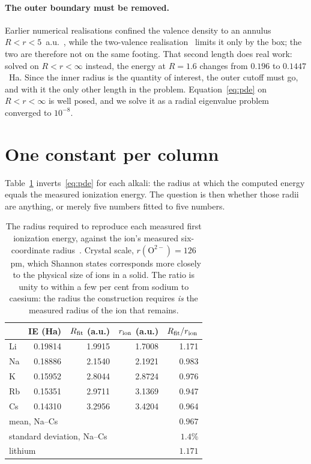 \documentclass[11pt]{article}
\begin{document}
\paragraph{The outer boundary must be removed.} Earlier numerical realisations confined the
valence density to an annulus $R<r<5$~a.u.~\cite{Johnson-code1}, while the two-valence
realisation~\cite{Johnson-code2} limits it only by the box; the two are therefore not on the same
footing. That second length does real work: solved on
$R<r<\infty$ instead, the energy at $R=1.6$ changes from $0.196$ to $0.1447$~Ha. Since the
inner radius is the quantity of interest, the outer cutoff must go, and
with it the only other length in the problem. Equation~\eqref{eq:pde} on $R<r<\infty$ is
well posed, and we solve it as a radial eigenvalue problem converged to $10^{-8}$.

\section{One constant per column}\label{sec:oneconst}

Table~\ref{tab:alkali} inverts~\eqref{eq:pde} for each alkali: the radius at which the
computed energy equals the measured ionization energy. The question is then whether those
radii are anything, or merely five numbers fitted to five numbers.

\begin{table}[t]
\centering
\caption{The radius required to reproduce each measured first ionization energy, against the
ion's measured six-coordinate radius~\cite{Shannon1976}. Crystal scale,
$r(\mathrm{O}^{2-})=126$~pm, which Shannon states corresponds more closely to the physical
size of ions in a solid. The ratio is unity to within a few per cent from sodium to caesium:
the radius the construction requires \emph{is} the measured radius of the ion that remains.}
\label{tab:alkali}
\begin{tabular}{lrrrr}
\toprule
 & IE (Ha) & $R_{\rm fit}$ (a.u.) & $r_{\rm ion}$ (a.u.) & $R_{\rm fit}/r_{\rm ion}$ \\
\midrule
Li & 0.19814 & 1.9915 & 1.7008 & 1.171 \\
Na & 0.18886 & 2.1540 & 2.1921 & 0.983 \\
K  & 0.15952 & 2.8044 & 2.8724 & 0.976 \\
Rb & 0.15351 & 2.9711 & 3.1369 & 0.947 \\
Cs & 0.14310 & 3.2956 & 3.4204 & 0.964 \\
\midrule
\multicolumn{4}{l}{mean, Na--Cs} & $0.967$ \\
\multicolumn{4}{l}{standard deviation, Na--Cs} & $1.4\%$ \\
\multicolumn{4}{l}{lithium} & $1.171$ \\
\bottomrule
\end{tabular}
\end{table}
\end{document}
